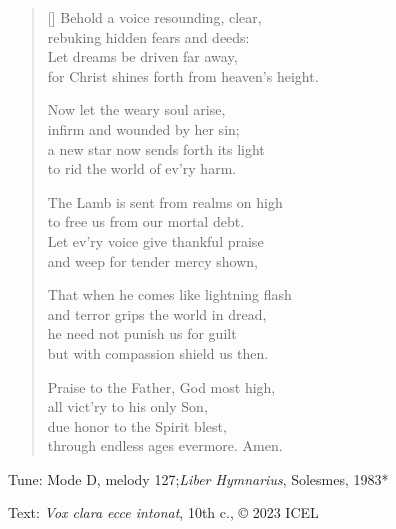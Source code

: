 \hymn

\settowidth{\versewidth}{for Christ shines forth from heaven’s height.}

\begin{verse}[\versewidth]
Behold a voice resounding, clear,\\
rebuking hidden fears and deeds:\\
Let dreams be driven far away,\\
for Christ shines forth from heaven’s height.

Now let the weary soul arise,\\
infirm and wounded by her sin;\\
a new star now sends forth its light\\
to rid the world of ev’ry harm.

The Lamb is sent from realms on high\\
to free us from our mortal debt.\\
Let ev’ry voice give thankful praise\\
and weep for tender mercy shown,

That when he comes like lightning flash\\
and terror grips the world in dread,\\
he need not punish us for guilt\\
but with compassion shield us then.

Praise to the Father, God most high,\\
all vict’ry to his only Son,\\
due honor to the Spirit blest,\\
through endless ages evermore. Amen.
\end{verse}

\begin{hymnsource}
Tune: Mode D, melody 127;\emph{Liber Hymnarius}, Solesmes, 1983*

Text: \emph{Vox clara ecce intonat}, 10th c., © 2023 ICEL
\end{hymnsource}